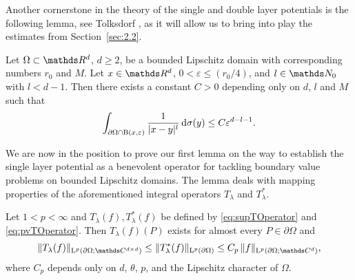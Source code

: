 Another cornerstone in the theory of the single and double layer potentials is the following lemma, see Tolksdorf \cite[Lem.\@~4.3.2]{tolksdorf}, as it will allow us to bring into play the estimates from Section~\ref{sec:2.2}.

\begin{lem}
  \label{lem:central}
  Let $\Omega \subset \R^d$, $d \geq 2$, be a bounded Lipschitz domain with corresponding numbers $r_0$ and $M$.
  Let $x \in \R^d$, $0 < \varepsilon \leq (r_0/4)$, and $l \in \N_0$ with $l < d - 1$.
  Then there exists a constant $C > 0$ depending only on $d$, $l$ and $M$ such that
  \begin{align*}
    \int_{\partial\Omega \cap \mathrm{B}(x, \varepsilon)} \frac{1}{|x - y|^l} \, {\operatorname{d}\!{\sigma}}(y) \leq C \varepsilon^{d - l - 1}.
  \end{align*}
\end{lem}

We are now in the position to prove our first lemma on the way to establish the single layer potential as a benevolent operator for tackling boundary value problems on bounded Lipschitz domains. 
The lemma deals with mapping properties of the aforementioned integral operators $T_\lambda$ and $T_\lambda^*$.

\begin{lem}
  \label{lem:lpBoundednessT}
  Let $1 < p < \infty$ and $T_\lambda(f), T_\lambda^*(f)$ be defined by \eqref{eq:supTOperator} and \eqref{eq:pvTOperator}.
  Then $T_\lambda(f)(P)$ exists for almost every $P \in \partial\Omega$ and
  \begin{align}
    \label{eq:lpBoundednessT}
    \|T_\lambda(f) \|_{\Ell^p(\partial\Omega; \C^{d \times d})}
    \leq \|T_\lambda^*(f) \|_{\Ell^p(\partial\Omega)}
    \leq C_p \, \|f\|_{\Ell^p(\partial\Omega; \C^d)},
  \end{align}
  where $C_p$ depends only on $d$, $\theta$, $p$, and the Lipschitz character of $\Omega$.
\end{lem}


